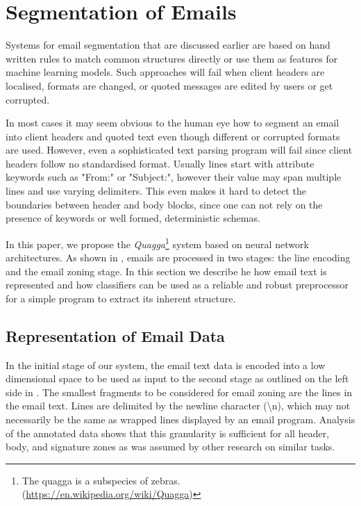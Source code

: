 \documentclass{llncs}
\begin{document}




\newpage
\section{Segmentation of Emails}
\label{sec:model}
Systems for email segmentation that are discussed earlier are based on hand written rules to match common structures directly or use them as features for machine learning models.
Such approaches will fail when client headers are localised, formats are changed, or quoted messages are edited by users or get corrupted.

In most cases it may seem obvious to the human eye how to segment an email into client headers and quoted text even though different or corrupted formats are used.
However, even a sophisticated text parsing program will fail since client headers follow no standardised format.
Usually lines start with attribute keywords such as "From:" or "Subject:", however their value may span multiple lines and use varying delimiters.
This even makes it hard to detect the boundaries between header and body blocks, since one can not rely on the presence of keywords or well formed, deterministic schemas.

\begin{figure}[tb]
\end{figure}

In this paper, we propose the \textit{Quagga}\footnote{The quagga is a subspecies of zebras. (\url{https://en.wikipedia.org/wiki/Quagga})} system based on neural network architectures.
As shown in , emails are processed in two stages: the line encoding and the email zoning stage.
In this section we describe he how email text is represented and how classifiers can be used as a reliable and robust preprocessor for a simple program to extract its inherent structure.

\subsection{Representation of Email Data}
In the initial stage of our system, the email text data is encoded into a low dimensional space to be used as input to the second stage as outlined on the left side in .
The smallest fragments to be considered for email zoning are the lines in the email text.
Lines are delimited by the newline character (\textbackslash n), which may not necessarily be the same as wrapped lines displayed by an email program.
Analysis of the annotated data shows that this granularity is sufficient for all header, body, and signature zones as was assumed by other research on similar tasks.
\end{document}
